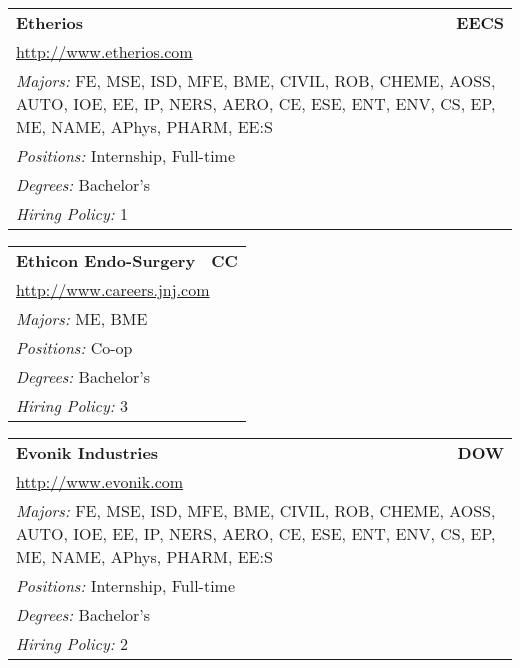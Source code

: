 \documentclass[twoside]{article}
\begin{document}
\begin{center}
\begin{multicols}{3}
\begin{FlushLeft}
\begin{minipage}{\columnwidth}\begin{tabularx}{.95\columnwidth}{Xr}
                 {\Large\bf Etherios} & {\Large\bf EECS}\\
    \multicolumn{2}{p{.95\columnwidth}}{\url{http://www.etherios.com}}\\
    \multicolumn{2}{p{.95\columnwidth}}{\emph{Majors:} FE, MSE, ISD, MFE, BME, CIVIL, ROB, CHEME, AOSS, AUTO, IOE, EE, IP, NERS, AERO, CE, ESE, ENT, ENV, CS, EP, ME, NAME, APhys, PHARM, EE:S}\\
    \multicolumn{2}{p{.95\columnwidth}}{\emph{Positions:} Internship, Full-time}\\
    \multicolumn{2}{p{.95\columnwidth}}{\emph{Degrees:} Bachelor's}\\
    \multicolumn{2}{p{.95\columnwidth}}{\emph{Hiring Policy:} 1}\\
    \end{tabularx}
    
\end{minipage}
 
\begin{minipage}{\columnwidth}\begin{tabularx}{.95\columnwidth}{Xr}
                 {\Large\bf Ethicon Endo-Surgery} & {\Large\bf CC}\\
    \multicolumn{2}{p{.95\columnwidth}}{\url{http://www.careers.jnj.com}}\\
    \multicolumn{2}{p{.95\columnwidth}}{\emph{Majors:} ME, BME}\\
    \multicolumn{2}{p{.95\columnwidth}}{\emph{Positions:} Co-op}\\
    \multicolumn{2}{p{.95\columnwidth}}{\emph{Degrees:} Bachelor's}\\
    \multicolumn{2}{p{.95\columnwidth}}{\emph{Hiring Policy:} 3}\\
    \end{tabularx}
    
\end{minipage}
 
\begin{minipage}{\columnwidth}\begin{tabularx}{.95\columnwidth}{Xr}
                 {\Large\bf Evonik Industries} & {\Large\bf DOW}\\
    \multicolumn{2}{p{.95\columnwidth}}{\url{http://www.evonik.com}}\\
    \multicolumn{2}{p{.95\columnwidth}}{\emph{Majors:} FE, MSE, ISD, MFE, BME, CIVIL, ROB, CHEME, AOSS, AUTO, IOE, EE, IP, NERS, AERO, CE, ESE, ENT, ENV, CS, EP, ME, NAME, APhys, PHARM, EE:S}\\
    \multicolumn{2}{p{.95\columnwidth}}{\emph{Positions:} Internship, Full-time}\\
    \multicolumn{2}{p{.95\columnwidth}}{\emph{Degrees:} Bachelor's}\\
    \multicolumn{2}{p{.95\columnwidth}}{\emph{Hiring Policy:} 2}\\
    \end{tabularx}
    

\end{minipage}
\end{FlushLeft}
\end{multicols}
\end{center}
\end{document}
